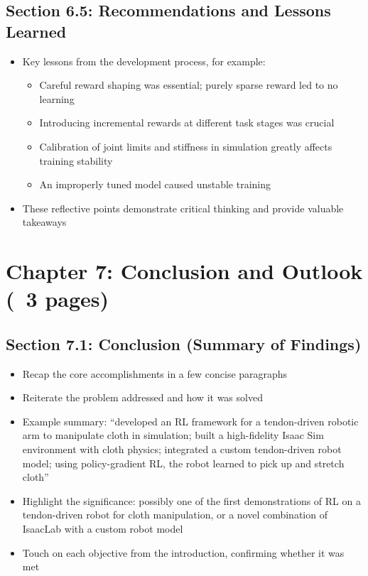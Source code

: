 \subsection{Section 6.5: Recommendations and Lessons Learned}
\begin{itemize}
    \item Key lessons from the development process, for example:
    \begin{itemize}
        \item Careful reward shaping was essential; purely sparse reward led to no learning
        \item Introducing incremental rewards at different task stages was crucial
        \item Calibration of joint limits and stiffness in simulation greatly affects training stability
        \item An improperly tuned model caused unstable training
    \end{itemize}
    \item These reflective points demonstrate critical thinking and provide valuable takeaways
\end{itemize}

\section{Chapter 7: Conclusion and Outlook (~3 pages)}

\subsection{Section 7.1: Conclusion (Summary of Findings)}
\begin{itemize}
    \item Recap the core accomplishments in a few concise paragraphs
    \item Reiterate the problem addressed and how it was solved
    \item Example summary: ``developed an RL framework for a tendon-driven robotic arm to manipulate cloth in simulation; built a high-fidelity Isaac Sim environment with cloth physics; integrated a custom tendon-driven robot model; using policy-gradient RL, the robot learned to pick up and stretch cloth''
    \item Highlight the significance: possibly one of the first demonstrations of RL on a tendon-driven robot for cloth manipulation, or a novel combination of IsaacLab with a custom robot model
    \item Touch on each objective from the introduction, confirming whether it was met
\end{itemize}

